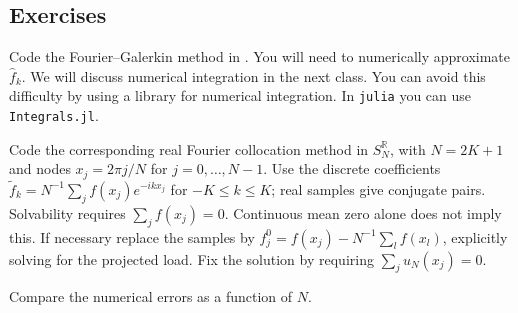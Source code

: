 \subsection*{Exercises}

\begin{exercises}
    \ex[]
    Code the Fourier--Galerkin method in . You will need to numerically approximate $\hat f_k$.
    We will discuss numerical integration in the next class.
    You can avoid this difficulty by using a library for numerical integration. In \texttt{julia} you can use \texttt{Integrals.jl}.

Code the corresponding real Fourier collocation method in $S_N^{\mathbb R}$, with $N=2K+1$ and nodes $x_j=2\pi j/N$ for $j=0,\dots,N-1$. Use the discrete coefficients $\tilde f_k=N^{-1}\sum_j f(x_j)e^{-ikx_j}$ for $-K\le k\le K$; real samples give conjugate pairs. Solvability requires $\sum_j f(x_j)=0$. Continuous mean zero alone does not imply this. If necessary replace the samples by $f_j^0=f(x_j)-N^{-1}\sum_l f(x_l)$, explicitly solving for the projected load. Fix the solution by requiring $\sum_j u_N(x_j)=0$.

    Compare the numerical errors as a function of $N$.
\end{exercises}

